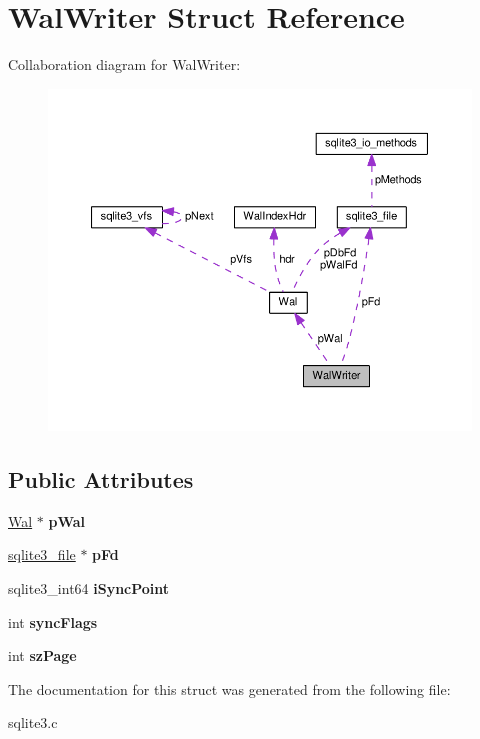 \hypertarget{structWalWriter}{}\section{Wal\+Writer Struct Reference}
\label{structWalWriter}


Collaboration diagram for Wal\+Writer\+:\nopagebreak
\begin{figure}[H]
\begin{center}
\leavevmode
\includegraphics[width=350pt]{structWalWriter__coll__graph}
\end{center}
\end{figure}
\subsection*{Public Attributes}
\begin{DoxyCompactItemize}
\item 
\hyperlink{structWal}{Wal} $\ast$ {\bfseries p\+Wal}\hypertarget{structWalWriter_a3ed1cabab4a2f0572ec04d2a174e5bf9}{}\label{structWalWriter_a3ed1cabab4a2f0572ec04d2a174e5bf9}

\item 
\hyperlink{structsqlite3__file}{sqlite3\+\_\+file} $\ast$ {\bfseries p\+Fd}\hypertarget{structWalWriter_a0c98cddd084b97d9f531fa71b92ef40a}{}\label{structWalWriter_a0c98cddd084b97d9f531fa71b92ef40a}

\item 
sqlite3\+\_\+int64 {\bfseries i\+Sync\+Point}\hypertarget{structWalWriter_a1227aea1e12b6b409e8a7cdbae43588e}{}\label{structWalWriter_a1227aea1e12b6b409e8a7cdbae43588e}

\item 
int {\bfseries sync\+Flags}\hypertarget{structWalWriter_acc8dcbdc9b91bae4799b5de113742ae6}{}\label{structWalWriter_acc8dcbdc9b91bae4799b5de113742ae6}

\item 
int {\bfseries sz\+Page}\hypertarget{structWalWriter_aa161832c97830aed52410747ebde5e6e}{}\label{structWalWriter_aa161832c97830aed52410747ebde5e6e}

\end{DoxyCompactItemize}


The documentation for this struct was generated from the following file\+:\begin{DoxyCompactItemize}
\item 
sqlite3.\+c\end{DoxyCompactItemize}
